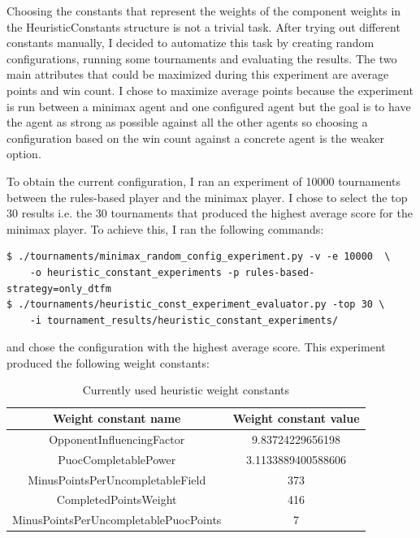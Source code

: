 Choosing the constants that represent the weights of the component weights in the HeuristicConstants structure is not a trivial task. After trying out different 
constants manually, I decided to automatize this task by creating random configurations, running some tournaments and evaluating the results. The two main attributes 
that could be maximized during this experiment are average points and win count. I chose to maximize average points because the experiment is run between
a minimax agent and one configured agent but the goal is to have the agent as strong as possible against all the other agents so choosing 
a configuration based on the win count against a concrete agent is the weaker option.


To obtain the current configuration, I ran an experiment of 10000 tournaments between the rules-based player and the minimax player. 
I chose to select the top 30 results i.e. the 30 tournaments that produced the highest average score for the minimax player. To achieve
this, I ran the following commands:

\begin{verbatim}
$ ./tournaments/minimax_random_config_experiment.py -v -e 10000  \ 
    -o heuristic_constant_experiments -p rules-based-strategy=only_dtfm 
$ ./tournaments/heuristic_const_experiment_evaluator.py -top 30 \
    -i tournament_results/heuristic_constant_experiments/ 
\end{verbatim}


and chose the configuration with the highest average score. This experiment produced the following weight constants:
\begin{table}[H] 
    \centering
    \begin{tabular}{|c|c|} %
    \hline
    Weight constant name & Weight constant value \\ \hline
    OpponentInfluencingFactor & 9.83724229656198    \\ \hline
    PuocCompletablePower & 3.1133889400588606 \\ \hline
    MinusPointsPerUncompletableField & 373 \\ \hline
    CompletedPointsWeight & 416    \\ \hline
    MinusPointsPerUncompletablePuocPoints & 7  \\ \hline
    \end{tabular}
    \caption{Currently used heuristic weight constants}
    \label{tab:example_table}
\end{table}

